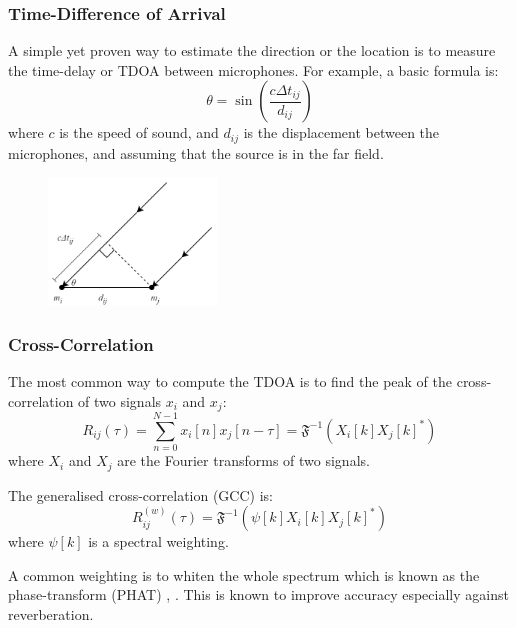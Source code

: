 \documentclass{beamer}
\begin{document}
\begin{frame}
\frametitle{Time-Difference of Arrival}

A simple yet proven way to estimate the direction or the location is to measure the time-delay or TDOA between microphones. For example, a basic formula is:
\begin{equation}
\theta = \sin\left( \frac{c\Delta t_{ij}}{d_{ij}} \right)
\end{equation}
\tiny{where $c$ is the speed of sound, and $d_{ij}$ is the displacement between the microphones, and assuming that the source is in the far field.}

\begin{figure}[H]
\includegraphics[width=0.4\textwidth]{./basic_tdoa.png}
\centering
\end{figure}

\end{frame}

\begin{frame}
\frametitle{Cross-Correlation}

The most common way to compute the TDOA is to find the peak of the cross-correlation of two signals $x_i$ and $x_j$:
\begin{equation}
R_{ij}(\tau) = \sum_{n=0}^{N-1} x_i[n]x_j[n-\tau] = \mathfrak{F}^{-1} \left( X_i[k]X_j[k]^* \right)
\end{equation}
\tiny{where $X_i$ and $X_j$ are the Fourier transforms of two signals.}\\\small

The generalised cross-correlation (GCC) is:
\begin{equation}
R^{(w)}_{ij}(\tau) = \mathfrak{F}^{-1} \left( \psi[k]X_i[k]X_j[k]^* \right)
\end{equation}
\tiny{where $\psi[k]$ is a spectral weighting.}\\\small

A common weighting is to whiten the whole spectrum which is known as the phase-transform (PHAT) \cite{argentieri_survey_2015}, \cite{rascon_localization_2017}. This is known to improve accuracy especially against reverberation.
\end{frame}
\end{document}
